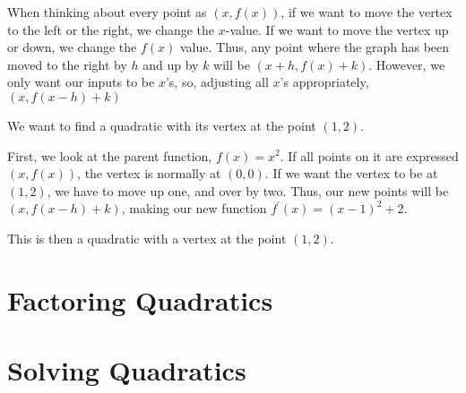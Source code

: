 When thinking about every point as $(x, f(x))$, if we want to move the vertex to the left or the right, we change the $x$-value.  If we want to move the vertex up or down, we change the $f(x)$ value.  Thus, any point where the graph has been moved to the right by $h$ and up by $k$ will be $(x + h, f(x) + k)$.  However, we only want our inputs to be $x$'s, so, adjusting all $x$'s appropriately, $(x, f(x-h)+k)$

\begin{example}

We want to find a quadratic with its vertex at the point $(1,2)$.

First, we look at the parent function, $f(x) = x^2$.  If all points on it are expressed $(x, f(x))$, the vertex is normally at $(0,0)$.  If we want the vertex to be at $(1,2)$, we have to move up one, and over by two.  Thus, our new points will be $(x, f(x-h)+k)$, making our new function $f^\prime(x) = (x-1)^2 + 2$.

This is then a quadratic with a vertex at the point $(1,2)$.

\end{example}

\section*{Factoring Quadratics}



\section*{Solving Quadratics}
